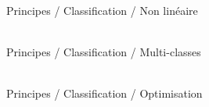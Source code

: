 \begin{frame}{\bititle\\Principes / Classification / Non linéaire}
\begin{center}


\end{center}
\end{frame}
\begin{frame}{\bititle\\Principes / Classification / Multi-classes}

\end{frame}
\begin{frame}{\bititle\\Principes / Classification / Optimisation}

\end{frame}
